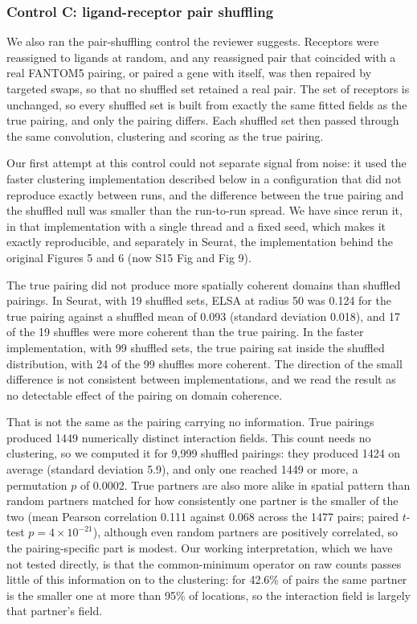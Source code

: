 \documentclass[11pt]{article}
\begin{document}
\subsubsection*{Control C: ligand-receptor pair shuffling}

We also ran the pair-shuffling control the reviewer suggests. Receptors were reassigned to
ligands at random, and any reassigned pair that coincided with a real FANTOM5 pairing, or
paired a gene with itself, was then repaired by targeted swaps, so that no shuffled set
retained a real pair. The set of receptors is unchanged, so every shuffled set is built from
exactly the same fitted fields as the true pairing, and only the pairing differs. Each
shuffled set then passed through the same convolution, clustering and scoring as the true
pairing.

Our first attempt at this control could not separate signal from noise: it used the faster
clustering implementation described below in a configuration that did not reproduce exactly
between runs, and the difference between the true pairing and the shuffled null was smaller
than the run-to-run spread. We have since rerun it, in that implementation with a single
thread and a fixed seed, which makes it exactly reproducible, and separately in Seurat, the
implementation behind the original Figures 5 and 6 (now S15 Fig and Fig 9).

The true pairing did not produce more spatially coherent domains than shuffled pairings. In
Seurat, with 19 shuffled sets, ELSA at radius 50 was 0.124 for the true pairing against a
shuffled mean of 0.093 (standard deviation 0.018), and 17 of the 19 shuffles were more
coherent than the true pairing. In the faster implementation, with 99 shuffled sets, the
true pairing sat inside the shuffled distribution, with 24 of the 99 shuffles more coherent.
The direction of the small difference is not consistent between implementations, and we read
the result as no detectable effect of the pairing on domain coherence.

That is not the same as the pairing carrying no information. True pairings produced 1449
numerically distinct interaction fields. This count needs no clustering, so we computed it
for 9,999 shuffled pairings: they produced 1424 on average (standard deviation 5.9), and only
one reached 1449 or more, a permutation $p$ of 0.0002. True partners are also more alike in spatial pattern
than random partners matched for how consistently one partner is the smaller of the two
(mean Pearson correlation 0.111 against 0.068 across the 1477 pairs; paired $t$-test
$p = 4 \times 10^{-21}$), although even random partners are positively correlated, so the
pairing-specific part is modest. Our working interpretation, which we have not tested
directly, is that the common-minimum operator on raw counts passes little of this
information on to the clustering: for 42.6\% of pairs the same partner is the smaller one at
more than 95\% of locations, so the interaction field is largely that partner's field.
\end{document}
